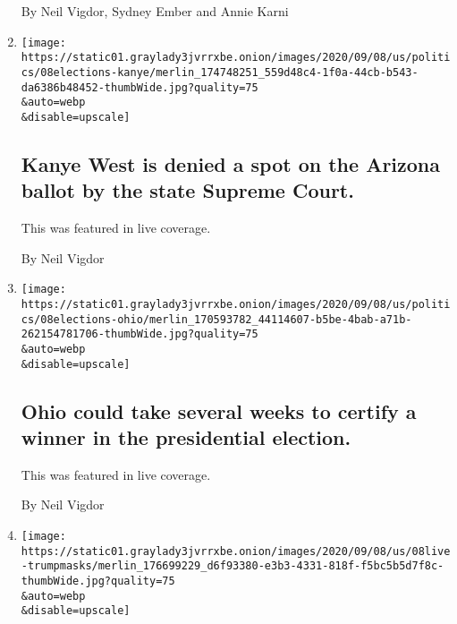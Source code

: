 \begin{enumerate}
  By Neil Vigdor, Sydney Ember and Annie Karni
\item
  \href{/live/2020/09/08/us/trump-vs-biden/kanye-west-is-denied-a-spot-on-the-arizona-ballot-by-the-state-supreme-court}{}

  \texttt{[image: https://static01.graylady3jvrrxbe.onion/images/2020/09/08/us/politics/08elections-kanye/merlin\_174748251\_559d48c4-1f0a-44cb-b543-da6386b48452-thumbWide.jpg?quality=75\\\&auto=webp\\\&disable=upscale]}

  \hypertarget{kanye-west-is-denied-a-spot-on-the-arizona-ballot-by-the-state-supreme-court}{%
  \subsection{Kanye West is denied a spot on the Arizona ballot by the
  state Supreme
  Court.}\label{kanye-west-is-denied-a-spot-on-the-arizona-ballot-by-the-state-supreme-court}}

  This was featured in live coverage.

  By Neil Vigdor
\item
  \href{/live/2020/09/08/us/trump-vs-biden/ohio-could-take-several-weeks-to-certify-a-winner-in-the-presidential-election}{}

  \texttt{[image: https://static01.graylady3jvrrxbe.onion/images/2020/09/08/us/politics/08elections-ohio/merlin\_170593782\_44114607-b5be-4bab-a71b-262154781706-thumbWide.jpg?quality=75\\\&auto=webp\\\&disable=upscale]}

  \hypertarget{ohio-could-take-several-weeks-to-certify-a-winner-in-the-presidential-election}{%
  \subsection{Ohio could take several weeks to certify a winner in the
  presidential
  election.}\label{ohio-could-take-several-weeks-to-certify-a-winner-in-the-presidential-election}}

  This was featured in live coverage.

  By Neil Vigdor
\item
  \href{/live/2020/09/08/us/trump-vs-biden/the-president-denounces-coronavirus-restrictions-biden-has-questions-about-proposed-vaccine}{}

  \texttt{[image: https://static01.graylady3jvrrxbe.onion/images/2020/09/08/us/08live-trumpmasks/merlin\_176699229\_d6f93380-e3b3-4331-818f-f5bc5b5d7f8c-thumbWide.jpg?quality=75\\\&auto=webp\\\&disable=upscale]}


\end{enumerate}
